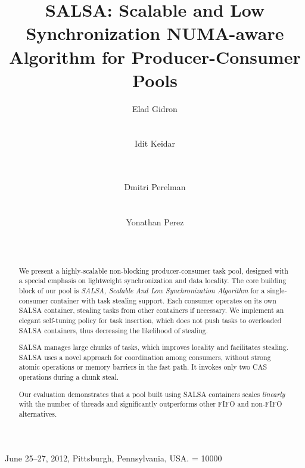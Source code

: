 \documentclass{sig-alternate}
\begin{document}
 {June 25--27, 2012, Pittsburgh, Pennsylvania, USA.} 
\widowpenalty = 10000

\title{SALSA: Scalable and Low Synchronization NUMA-aware Algorithm for Producer-Consumer Pools}


\author{
\alignauthor
Elad Gidron\\
\\
\\
\alignauthor
Idit Keidar\\
\\
\\
\and
\alignauthor
Dmitri Perelman\\
\\
\\
\alignauthor
Yonathan Perez\\
\\
\\
}

\date{}

\maketitle 

\begin{abstract}
We present a highly-scalable non-blocking producer-consumer task pool, designed with a special emphasis on lightweight synchronization and data locality.
The core building block of our pool is \emph{SALSA, Scalable And Low Synchronization Algorithm} for a single-consumer container with task stealing support. Each consumer operates on its own SALSA container, stealing tasks from other containers if necessary. We implement an elegant self-tuning policy for task insertion, which does not push tasks to overloaded SALSA containers, thus decreasing the likelihood of stealing. 

SALSA manages large chunks of tasks, which improves locality and facilitates stealing. 
SALSA uses a novel approach for coordination among consumers, without strong atomic operations or memory barriers in the fast path. It invokes only two CAS operations during a chunk steal. 

Our evaluation demonstrates that a pool built using SALSA containers scales \emph{linearly} with the number of threads and significantly outperforms other FIFO and non-FIFO alternatives.

\end{abstract}
\end{document}
